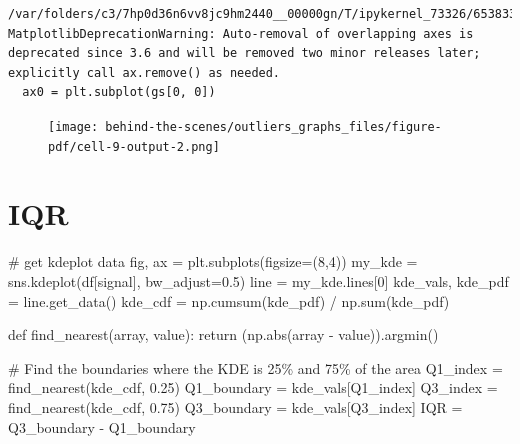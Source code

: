 \documentclass[
  letterpaper,
  DIV=11,
  numbers=noendperiod,
  oneside]{scrreprt}
\newenvironment{Shaded}{\begin{snugshade}}{\end{snugshade}}
\newcommand{\BuiltInTok}[1]{\textcolor[rgb]{0.00,0.23,0.31}{#1}}
\newcommand{\CommentTok}[1]{\textcolor[rgb]{0.37,0.37,0.37}{#1}}
\newcommand{\ControlFlowTok}[1]{\textcolor[rgb]{0.00,0.23,0.31}{#1}}
\newcommand{\DecValTok}[1]{\textcolor[rgb]{0.68,0.00,0.00}{#1}}
\newcommand{\FloatTok}[1]{\textcolor[rgb]{0.68,0.00,0.00}{#1}}
\newcommand{\KeywordTok}[1]{\textcolor[rgb]{0.00,0.23,0.31}{#1}}
\newcommand{\NormalTok}[1]{\textcolor[rgb]{0.00,0.23,0.31}{#1}}
\newcommand{\OperatorTok}[1]{\textcolor[rgb]{0.37,0.37,0.37}{#1}}
\newcommand{\StringTok}[1]{\textcolor[rgb]{0.13,0.47,0.30}{#1}}
\begin{document}
\begin{verbatim}
/var/folders/c3/7hp0d36n6vv8jc9hm2440__00000gn/T/ipykernel_73326/653833997.py:6: MatplotlibDeprecationWarning: Auto-removal of overlapping axes is deprecated since 3.6 and will be removed two minor releases later; explicitly call ax.remove() as needed.
  ax0 = plt.subplot(gs[0, 0])
\end{verbatim}

\begin{figure}[H]

{\centering \texttt{[image: behind-the-scenes/outliers\_graphs\_files/figure-pdf/cell-9-output-2.png]}

}

\end{figure}

\hypertarget{iqr-1}{%
\section{IQR}\label{iqr-1}}

\begin{Shaded}
\begin{Highlighting}[]
\CommentTok{\# get kdeplot data}
\NormalTok{fig, ax }\OperatorTok{=}\NormalTok{ plt.subplots(figsize}\OperatorTok{=}\NormalTok{(}\DecValTok{8}\NormalTok{,}\DecValTok{4}\NormalTok{))}
\NormalTok{my\_kde }\OperatorTok{=}\NormalTok{ sns.kdeplot(df[}\StringTok{\textquotesingle{}signal\textquotesingle{}}\NormalTok{], bw\_adjust}\OperatorTok{=}\FloatTok{0.5}\NormalTok{)}
\NormalTok{line }\OperatorTok{=}\NormalTok{ my\_kde.lines[}\DecValTok{0}\NormalTok{]}
\NormalTok{kde\_vals, kde\_pdf }\OperatorTok{=}\NormalTok{ line.get\_data()}
\NormalTok{kde\_cdf }\OperatorTok{=}\NormalTok{ np.cumsum(kde\_pdf) }\OperatorTok{/}\NormalTok{ np.}\BuiltInTok{sum}\NormalTok{(kde\_pdf)}

\KeywordTok{def}\NormalTok{ find\_nearest(array, value):}
    \ControlFlowTok{return}\NormalTok{ (np.}\BuiltInTok{abs}\NormalTok{(array }\OperatorTok{{-}}\NormalTok{ value)).argmin()}

\CommentTok{\# Find the boundaries where the KDE is 25\% and 75\% of the area}
\NormalTok{Q1\_index }\OperatorTok{=}\NormalTok{ find\_nearest(kde\_cdf, }\FloatTok{0.25}\NormalTok{)}
\NormalTok{Q1\_boundary }\OperatorTok{=}\NormalTok{ kde\_vals[Q1\_index]}
\NormalTok{Q3\_index }\OperatorTok{=}\NormalTok{ find\_nearest(kde\_cdf, }\FloatTok{0.75}\NormalTok{)}
\NormalTok{Q3\_boundary }\OperatorTok{=}\NormalTok{ kde\_vals[Q3\_index]}
\NormalTok{IQR }\OperatorTok{=}\NormalTok{ Q3\_boundary }\OperatorTok{{-}}\NormalTok{ Q1\_boundary}
\end{Highlighting}
\end{Shaded}
\end{document}
